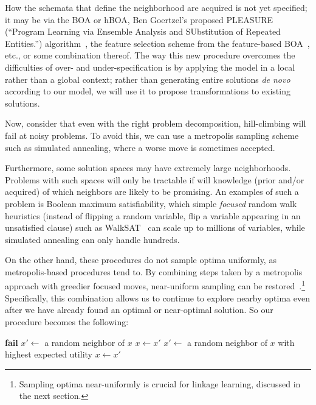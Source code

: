 \documentclass[letterpaper]{article}
\begin{document}
How the schemata that define the neighborhood are acquired is not yet
specified; it may be via the BOA or hBOA, Ben Goertzel's proposed PLEASURE
(``Program Learning via Ensemble Analysis and SUbstitution of Repeated
Entities.'')  algorithm~\cite{PLEASURE}, the feature selection scheme from the
feature-based BOA~\cite{fbBOA}, etc., or some combination thereof. The way this
new procedure overcomes the difficulties of over- and under-specification is by
applying the model in a local rather than a global context; rather than
generating entire solutions \emph{de novo} according to our model, we will use
it to propose transformations to existing solutions.

Now, consider that even with the right problem decomposition, hill-climbing
will fail at noisy problems. To avoid this, we can use a metropolis sampling
scheme such as simulated annealing, where a worse move is sometimes accepted.

Furthermore, some solution spaces may have extremely large
neighborhoods. Problems with such spaces will only be tractable if will
knowledge (prior and/or acquired) of which neighbors are likely to be
promising. An examples of such a problem is Boolean maximum satisfiability,
which simple \emph{focused} random walk heuristics (instead of flipping a
random variable, flip a variable appearing in an unsatisfied clause) such as
WalkSAT~\cite{WalkSAT} can scale up to millions of variables, while simulated
annealing can only handle hundreds. 

On the other hand, these procedures do not sample optima uniformly, as
metropolis-based procedures tend to. By combining steps taken by a metropolis
approach with greedier focused moves, near-uniform sampling can be
restored~\cite{WalkSampling}.\footnote{Sampling optima near-uniformly is
  crucial for linkage learning, discussed in the next section.} Specifically,
this combination allows us to continue to explore nearby optima even after we
have already found an optimal or near-optimal solution. So our procedure
becomes the following:

\begin{algorithmic}
      \State \textbf{fail}
      \State $x' \leftarrow$ a random neighbor of $x$
        \State $x \leftarrow x'$
      \EndIf
    \Else
      \State $x' \leftarrow$ a random neighbor of $x$ with highest expected
      utility
        \State $x \leftarrow x'$
      \EndIf
    \EndIf
  \EndWhile
\EndProcedure
\end{algorithmic}
\end{document}
